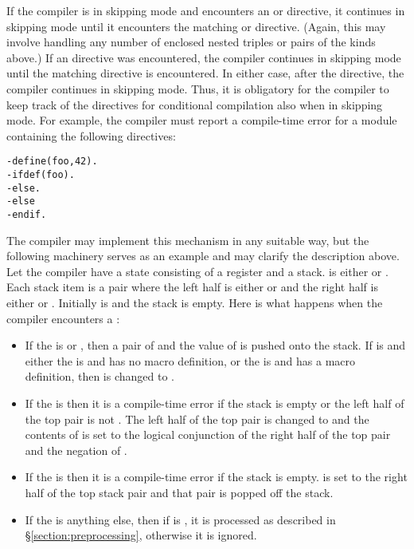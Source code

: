 If the compiler is in skipping mode and encounters an 
or  directive, it continues in skipping mode until
it encounters the matching  or  directive.  (Again,
this may involve handling any number of enclosed nested triples or
pairs of the kinds above.)  If an  directive was encountered,
the compiler continues in skipping mode until the matching 
directive is encountered.  In either case, after the 
directive, the compiler continues in skipping mode.  Thus, it is
obligatory for the compiler to keep track of the directives for
conditional compilation also when in skipping mode.  For example, the
compiler must report a compile-time error for a module containing the
following directives:
\begin{verbatim}
-define(foo,42).
-ifdef(foo).
-else.
-else
-endif.
\end{verbatim}

The compiler may implement this mechanism in any suitable way, but the
following machinery serves as an example and may clarify the
description above.  Let the compiler have a state consisting of a
register  and a stack.   is
either  or .  Each stack item is a pair where the
left half is either  or  and the right half is either
 or . Initially  is  and the
stack is empty.  Here is what happens when the compiler encounters a
:
\begin{itemize}
\item If the  is  or , then
a pair of  and the value of  is pushed onto the stack.
If  is  and either
the  is  and  has no macro definition,
or the  is  and  has a macro definition,
then  is changed to .
\item If the  is  then it is a compile-time error if
the stack is empty or the left half of the top pair is not .  The left half
of the top pair is changed to  and the contents of  is set
to the logical conjunction of the right half of the top pair and
the negation of .
\item If the  is  then it is a compile-time error if
the stack is empty.   is set to the right half of the top stack pair
and that pair is popped off the stack.
\item If the  is anything else, then if  is ,
it is processed as described in \S\ref{section:preprocessing}, otherwise it is
ignored.
\end{itemize}

